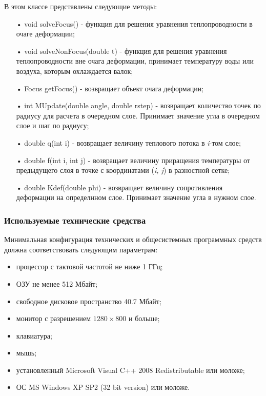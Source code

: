 В этом классе представлены следующие методы:
\begin{itemize}
\item[•] void solveFocus() - функция для решения уравнения теплопроводности в очаге деформации;
\item[•] void solveNonFocus(double t) - функция для решения уравнения теплопроводности вне очага деформации, принимает температуру воды или воздуха, которым охлаждается валок;
\item[•] Focus getFocus() - возвращает объект очага деформации;
\item[•] int MUpdate(double angle, double rstep) - возвращает количество точек по радиусу для расчета в очередном слое. Принимает значение угла в очередном слое и шаг по радиусу;
\item[•] double q(int i) - возвращает величину теплового потока в \textit{i}-том слое;
\item[•] double f(int i, int j) - возвращает величину приращения температуры от предыдущего слоя в точке с координатами (\textit{i, j}) в разностной сетке;
\item[•] double Kdef(double phi) - возвращает величину сопротивления деформации на определнном слое. Принимает значение угла в нужном слое.
\end{itemize}

\newpage


\subsubsection{Используемые технические средства}
Минимальная конфигурация технических и общесистемных программных средств должна соответствовать следующим параметрам:

\begin{itemize}
\item процессор с тактовой частотой не ниже 1 ГГц;
\item ОЗУ не менее 512 Мбайт;
\item свободное дисковое пространство 40.7 Мбайт;
\item монитор с разрешением $1280\times 800$ и больше;
\item клавиатура;
\item мышь;
\item установленный Microsoft Visual C++ 2008 Redistributable или моложе;
\item ОС MS Windows XP SP2 (32 bit version) или моложе.
\end{itemize}

